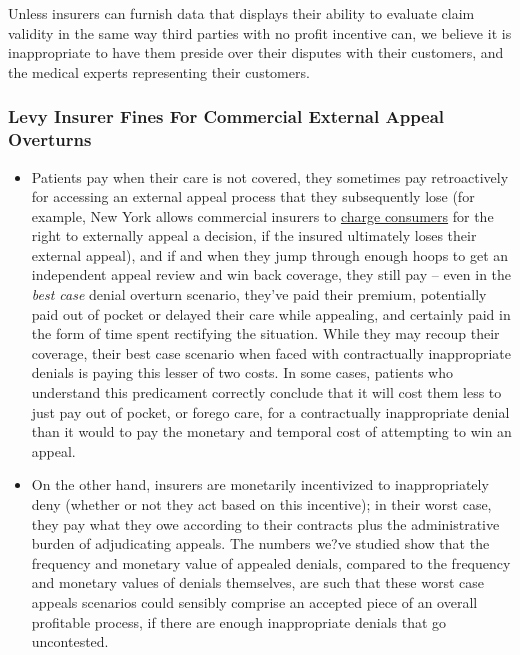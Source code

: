 \documentclass[12pt, a4paper,twoside,parskip=full]{report}
\theoremstyle{plain} %
\theoremstyle{definition} %
\theoremstyle{remark} %
\numberwithin{equation}{chapter}
\begin{document}
		Unless insurers can furnish data that displays their ability to evaluate claim validity in the same way third parties with no profit incentive can, 
		we believe it is inappropriate to have them preside over their disputes with their customers, and the medical experts representing their customers. 
		
		
		\subsubsection{Levy Insurer Fines For Commercial External Appeal Overturns}
		
		\begin{itemize}
			
			\item  Patients pay when their care is not covered, they sometimes pay retroactively for accessing an external appeal process that they subsequently lose (for example, New
			York allows commercial insurers to \href{https://www.dfs.ny.gov/complaints/file_external_appeal}{charge consumers} for the right to externally appeal a decision, if the insured
			ultimately loses their external appeal),
			and if and when they jump through enough hoops to get an independent appeal review and win back coverage, they still pay --  even in the \emph{best case} denial overturn scenario, they've paid their premium,
			potentially paid out of pocket or delayed their care while appealing, and certainly paid in the form of time spent rectifying the situation. While they
			may recoup their coverage, their best case scenario when faced with contractually inappropriate denials is paying this lesser of two costs.
			In some cases, patients who understand this predicament correctly conclude that it will cost them less to just pay out of pocket, or forego care,
			for a contractually inappropriate denial than it would to pay the monetary and temporal cost of attempting to win an appeal.
			
			\item On the other hand, insurers are monetarily incentivized to inappropriately deny (whether or not they act based on this incentive); in their worst case, they pay what 
			they owe according to their contracts plus the administrative burden of adjudicating appeals. The numbers we?ve studied show that the frequency and monetary value 
			of appealed denials, compared to the frequency and monetary values of denials themselves, are such that these worst case appeals scenarios could sensibly comprise an accepted piece 
			of an overall profitable process, if there are enough inappropriate denials that go uncontested.
			

\end{itemize}
\end{document}
